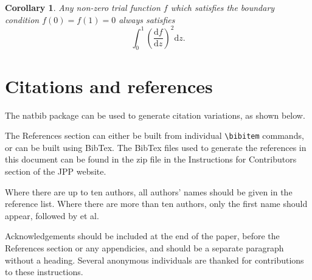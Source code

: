 \documentclass[12pt]{Style/RBM_P}
\newtheorem{corollary}{Corollary}
\begin{document}
\begin{corollary}
Any non-zero trial function $f$ which satisfies the boundary condition
$f(0)=f(1)=0$ always satisfies
\begin{equation}
  \int_0^1 \left( \frac{\mathrm{d} f}{\mathrm{d} z} \right)^2 \mathrm{d} z.
\end{equation}
\end{corollary}


\section{Citations and references}

The natbib package can be used to generate citation variations, as shown below. \cite{wenThunderGBMFastGBDTs}


The References section can either be built from individual \verb#\bibitem# commands, or can be built using BibTex. The BibTex files used to generate the references in this document can be found in the zip file in the Instructions for Contributors section of the JPP website.

Where there are up to ten authors, all authors' names should be given in the reference list. Where there are more than ten authors, only the first name should appear, followed by et al.

Acknowledgements should be included at the end of the paper, before the References section or any appendicies, and should be a separate paragraph without a heading. Several anonymous individuals are thanked for contributions to these instructions.
\end{document}
